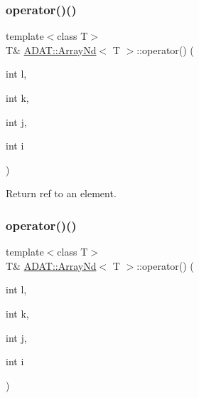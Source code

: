 \mbox{\label{classADAT_1_1ArrayNd_a0d3dfd90a9e68964948dbccb48b18f1d}} 
\subsubsection{\texorpdfstring{operator()()}{operator()()}\hspace{0.1cm}{\footnotesize\ttfamily [13/16]}}
{\footnotesize\ttfamily template$<$class T$>$ \\
T\& \mbox{\hyperlink{classADAT_1_1ArrayNd}{A\+D\+A\+T\+::\+Array\+Nd}}$<$ T $>$\+::operator() (\begin{DoxyParamCaption}\item[{int}]{l,  }\item[{int}]{k,  }\item[{int}]{j,  }\item[{int}]{i }\end{DoxyParamCaption})\hspace{0.3cm}{\ttfamily [inline]}}



Return ref to an element. 

\mbox{\label{classADAT_1_1ArrayNd_a0d3dfd90a9e68964948dbccb48b18f1d}} 
\subsubsection{\texorpdfstring{operator()()}{operator()()}\hspace{0.1cm}{\footnotesize\ttfamily [14/16]}}
{\footnotesize\ttfamily template$<$class T$>$ \\
T\& \mbox{\hyperlink{classADAT_1_1ArrayNd}{A\+D\+A\+T\+::\+Array\+Nd}}$<$ T $>$\+::operator() (\begin{DoxyParamCaption}\item[{int}]{l,  }\item[{int}]{k,  }\item[{int}]{j,  }\item[{int}]{i }\end{DoxyParamCaption})\hspace{0.3cm}{\ttfamily [inline]}}



